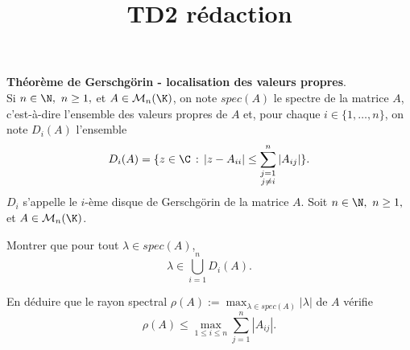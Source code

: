 

\newcommand{\tn}{\mathrm}
\newcommand{\eref}[1]{(\ref{#1})}
\newcommand{\dep}[2]{\partial_{#2}{#1}}
\newcommand{\dis}{\displaystyle}
\newcommand{\MmnK}{\mathcal{M}_{m,n}(\K)}
\newcommand{\MnpK}{\mathcal{M}_{n,p}(\K)}
\newcommand{\MnK}{\mathcal{M}_{n}(\K)}
\newcommand{\MmK}{\mathcal{M}_{m}(\K)}
\newcommand{\MmnR}{\mathcal{M}_{m,n}(\R)}
\newcommand{\MnR}{\mathcal{M}_{n}(\R)}
\newcommand{\MnC}{\mathcal{M}_{n}(\C)}
\newcommand{\MmR}{\mathcal{M}_{m}(\R)}
\newcommand{\nmt}[1]{|\mskip -2mu|\mskip -2mu|{#1}|\mskip -2mu |\mskip -2mu|}


\title{TD2 rédaction}


\maketitle
\begin{exo} {\bf Théorème de Gerschgörin - localisation des valeurs propres}.\ \\
  Si $n\in\N,\ n\geq1,$ et $A\in\MnK$, on note $spec(A)$ le spectre de la matrice $A$, c'est-à-dire l'ensemble des valeurs propres de $A$ et, pour chaque $i\in\{1,\dots,n\}$, on note $D_i(A)$ l'ensemble
  $$
  D_i(A)=\{z\in\C\, :\, |z-A_{ii}|\leq \sum_{\substack{j=1\\j\neq i}}^n|A_{ij}|\}.
  $$
  $D_i$ s'appelle le $i$-ème disque de Gerschgörin de la matrice $A$.
  Soit $n\in\N,\ n\geq1,$ et $A\in\MnK$.
\ben
  \item Montrer que pour tout $\lambda\in spec(A)$,
  $$
\lambda\in\displaystyle{\bigcup_{i=1}^n }D_i(A).
  $$
 \item En déduire que le rayon spectral $\rho(A):=\displaystyle{\max_{\lambda\in spec(A)}|\lambda|}$ de $A$ vérifie
  $$
  \rho(A)\leq\displaystyle{\max_{1\leq i\leq n}\sum_{j=1}^n|A_{ij}|}.
  $$
\een

\end{exo}
\newpage

